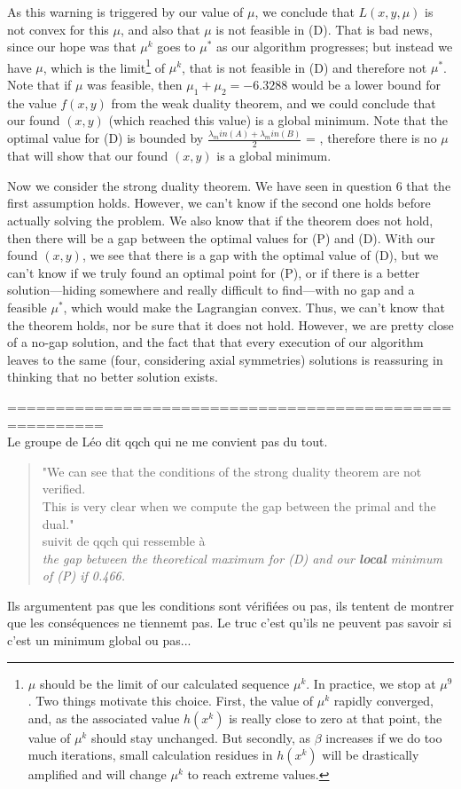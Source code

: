 \documentclass{article}
\begin{document}
As this warning is triggered by our value of $\mu$, we conclude that $L(x, y, \mu)$ is not convex for this $\mu$, and also that $\mu$ is not feasible in (D). That is bad news, since our hope was that $\mu^k$ goes to $\mu^*$ as our algorithm progresses; but instead we have $\mu$, which is the limit\footnote{$\mu$ should be the limit of our calculated sequence $\mu^k$. In practice, we stop at $\mu^9$. Two things motivate this choice. First, the value of $\mu^k$ rapidly converged, and, as the associated value $h(x^k)$ is really close to zero at that point, the value of $\mu^k$ should stay unchanged. But secondly, as $\beta$ increases if we do too much iterations, small calculation residues in $h(x^k)$ will be drastically amplified and will change $\mu^k$ to reach extreme values.}
of $\mu^k$, that is not feasible in (D) and therefore not $\mu^*$. Note that if $\mu$ was feasible, then $\mu_1 + \mu_2 = -6.3288$ would be a lower bound for the value $f(x, y)$ from the weak duality theorem, and we could conclude that our found $(x, y)$ (which reached this value) is a global minimum.
Note that the optimal value for (D) is bounded by $\frac{\lambda_min(A) + \lambda_min(B)}{2}$ = , therefore there is no $\mu$ that will show that our found $(x, y)$ is a global minimum. %

Now we consider the strong duality theorem. We have seen in question 6 that the first assumption holds. However, we can't know if the second one holds before actually solving the problem. We also know that if the theorem does not hold, then there will be a gap between the optimal values for (P) and (D). With our found $(x, y)$, we see that there is a gap with the optimal value of (D), but we can't know if we truly found an optimal point for (P), or if there is a better solution---hiding somewhere and really difficult to find---with no gap and a feasible $\mu^*$, which would make the Lagrangian convex. Thus, we can't know that the theorem holds, nor be sure that it does not hold. However, we are pretty close of a no-gap solution, and the fact that that every execution of our algorithm leaves to the same (four, considering axial symmetries) solutions is reassuring in thinking that no better solution exists.


\pagebreak
========================================================\\
Le groupe de Léo dit qqch qui ne me convient pas du tout.
\begin{quote}
"We can see that the conditions of the strong duality theorem are not verified.\\
This is very clear when we compute the gap between the primal and the dual."\\
suivit de qqch qui ressemble à\\
\textit{the gap between the theoretical maximum for (D) and our \textbf{local} minimum of (P)  if 0.466.}
\end{quote}
Ils argumentent pas que les conditions sont vérifiées ou pas, ils tentent de montrer que les conséquences ne tiennemt pas. Le truc c'est qu'ils ne peuvent pas savoir si c'est un minimum global ou pas...
\end{document}
